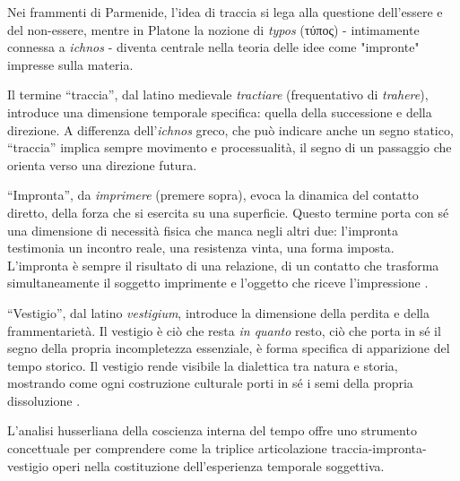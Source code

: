 \documentclass{../../lib/gs}
\begin{document}
Nei frammenti di Parmenide, l'idea di traccia si lega alla questione dell'essere e del non-essere, mentre in Platone la nozione di \textit{typos} (τύπος) - intimamente connessa a \textit{ichnos} - diventa centrale nella teoria delle idee come "impronte" impresse sulla materia.

Il termine “traccia”, dal latino medievale \textit{tractiare} (frequentativo di \textit{trahere}), introduce una dimensione temporale specifica: quella della successione e della direzione. A differenza dell'\textit{ichnos} greco, che può indicare anche un segno statico, “traccia” implica sempre movimento e processualità, il segno di un passaggio che orienta verso una direzione futura.


“Impronta”, da \textit{imprimere} (premere sopra), evoca la dinamica del contatto diretto, della forza che si esercita su una superficie. Questo termine porta con sé una dimensione di necessità fisica che manca negli altri due: l'impronta testimonia un incontro reale, una resistenza vinta, una forma imposta. L'impronta è sempre il risultato di una relazione, di un contatto che trasforma simultaneamente il soggetto imprimente e l'oggetto che riceve l'impressione \cite{merleau-ponty1945}.

“Vestigio”, dal latino \textit{vestigium}, introduce la dimensione della perdita e della frammentarietà. Il vestigio è ciò che resta \textit{in quanto} resto, ciò che porta in sé il segno della propria incompletezza essenziale, è forma specifica di apparizione del tempo storico. Il vestigio rende visibile la dialettica tra natura e storia, mostrando come ogni costruzione culturale porti in sé i semi della propria dissoluzione \cite{benjamin1928}.


L'analisi husserliana della coscienza interna del tempo \cite{husserl1928} offre uno strumento concettuale per comprendere come la triplice articolazione traccia-impronta-vestigio operi nella costituzione dell'esperienza temporale soggettiva.
\end{document}
